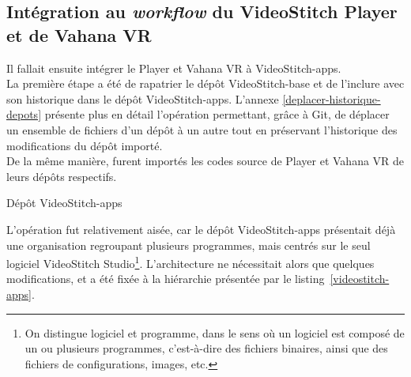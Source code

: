 \subsection{Intégration au \textit{workflow} du VideoStitch Player et de Vahana VR}
\label{integration-apps}
Il fallait ensuite intégrer le Player et Vahana VR à VideoStitch-apps.\\
La première étape a été de rapatrier le dépôt VideoStitch-base et de l'inclure
avec son historique dans le dépôt VideoStitch-apps. L'annexe \ref{deplacer-historique-depots}
présente plus en détail l'opération permettant, grâce à Git, de déplacer un ensemble 
de fichiers d'un dépôt à un autre tout en préservant l'historique des modifications du dépôt importé.\\
De la même manière, furent importés les codes source de Player et Vahana VR de 
leurs dépôts respectifs.\\
\begin{listing}
  \caption{Dépôt VideoStitch-apps}
  \label{videostitch-apps}
\end{listing}
L'opération fut relativement aisée, car le dépôt VideoStitch-apps présentait déjà
une organisation regroupant plusieurs programmes, mais centrés sur le seul logiciel
VideoStitch Studio\footnote{On distingue logiciel et programme, dans le sens où un logiciel
est composé de un ou plusieurs programmes, c'est-à-dire des fichiers binaires, ainsi que des
fichiers de configurations, images, etc.\cite{logiciel}}. L'architecture ne nécessitait alors que quelques modifications, et
a été fixée à la hiérarchie présentée par le listing~\ref{videostitch-apps}.\\
